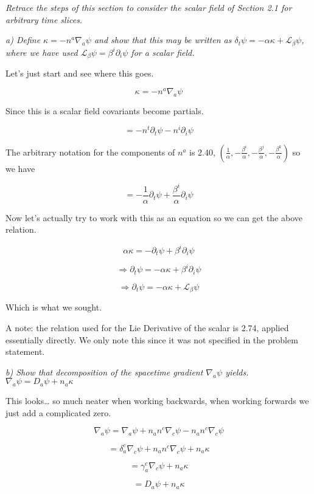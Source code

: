 \documentclass[landscape,letterpaper,10pt,english]{article}
\begin{document}
\[\label{P16}\]

\emph{Retrace the steps of this section to consider the scalar field of
Section 2.1 for arbitrary time slices.}

\emph{a) Define \(\kappa = -n^a \nabla_a \psi\) and show that this may
be written as
\(\delta_t \psi = -\alpha \kappa + \mathcal{L}_\beta \psi\), where we
have used \(\mathcal{L}_\beta \psi = \beta^i \partial_i \psi\) for a
scalar field.}

    Let's just start and see where this goes.

\[\kappa = -n^a \nabla_a \psi\]

Since this is a scalar field covariants become partials.

\[ = -n^t \partial_t \psi - n^i \partial_i \psi  \]

The arbitrary notation for the components of \(n^a\) is 2.40,
\((\frac1\alpha,-\frac{\beta^i}{\alpha},-\frac{\beta^j}{\alpha},-\frac{\beta^k}{\alpha})\)
so we have

\[ = -\frac{1}{\alpha} \partial_t \psi + \frac{\beta^i}{\alpha} \partial_i \psi  \]

Now let's actually try to work with this as an equation so we can get
the above relation.

\[ \alpha\kappa = -\partial_t \psi + \beta^i \partial_i \psi \]

\[ \Rightarrow \partial_t \psi = -\alpha \kappa + \beta^i \partial_i \psi \]

\[ \Rightarrow \partial_t \psi = -\alpha \kappa + \mathcal{L}_\beta \psi \]

Which is what we sought.

    A note: the relation used for the Lie Derivative of the scalar is 2.74,
applied essentially directly. We only note this since it was not
specified in the problem statement.

    \emph{b) Show that decomposition of the spacetime gradient
\(\nabla_a \psi\) yields. \(\nabla_a \psi = D_a \psi + n_a \kappa\)}

    This looks\ldots{} so much neater when working backwards, when working
forwards we just add a complicated zero.

\[\nabla_a \psi = \nabla_a \psi + n_a n^c \nabla_c \psi - n_a n^c \nabla_c \psi\]

\[ = \delta_a^c \nabla_c \psi + n_a n^c \nabla_c \psi + n_a \kappa \]

\[ = \gamma_a^c \nabla_c \psi + n_a \kappa \]

\[ = D_a \psi + n_a \kappa \]
\end{document}

